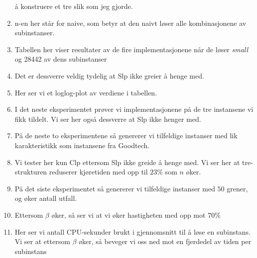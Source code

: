 \documentclass[a4paper,twocolumn]{report}
\begin{document}
\begin{enumerate}
      å konstruere et tre slik som jeg gjorde.
\item n-en her står for naive, som betyr at den naivt løser alle kombinasjonene
      av subinstanser.
\item Tabellen her viser resultater av de fire implementasjonene når de løser
      \textit{small} og 28442 av dens subinstanser
\item Det er dessverre veldig tydelig at Slp ikke greier å henge med.
\item Her ser vi et loglog-plot av verdiene i tabellen.
\item I det neste eksperimentet prøver vi implementasjonene på de tre
      instansene vi fikk tildelt. Vi ser her også dessverre at Slp
      ikke henger med.
\item På de neste to eksperimentene så genererer vi tilfeldige instanser med
      lik karakteristikk som instansene fra Goodtech.
\item Vi tester her kun Clp ettersom Slp ikke greide å henge med. Vi ser her at
      tre-strukturen reduserer kjøretiden med opp til $23\%$ som $n$ øker.
\item På det siste eksperimentet så genererer vi tilfeldige instanser med $50$
      grener, og øker antall utfall.
\item Ettersom $\beta$ øker, så ser vi at vi øker hastigheten med opp mot
      $70\%$
\item Her ser vi antall CPU-sekunder brukt i gjennomsnitt til å løse en
      subinstans. Vi ser at ettersom $\beta$ øker, så beveger vi oss ned
      mot en fjerdedel av tiden per subinstans
\end{enumerate}
\end{document}

